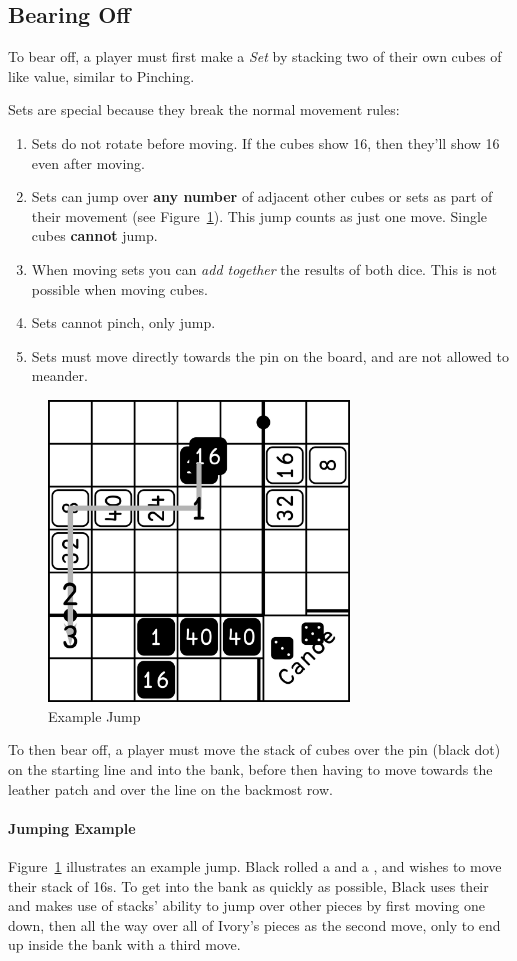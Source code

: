 \subsection{Bearing Off}\label{sec:bearing-off}
To bear off, a player must first make a \textit{Set} by stacking two of their own cubes of like value, similar to Pinching.

Sets are special because they break the normal movement rules:
\begin{enumerate}
    \item Sets do not rotate before moving. If the cubes show 16, then they'll show 16 even after moving.
    \item Sets can jump over \textbf{any number} of adjacent other cubes or sets as part of their movement (see Figure~\ref{fig:jump}). This jump counts as just one move. Single cubes \textbf{cannot} jump.
    \item When moving sets you can \textit{add together} the results of both dice. This is not possible when moving cubes.
    \item Sets cannot pinch, only jump.
    \item Sets must move directly towards the pin on the board, and are not allowed to meander.
\end{enumerate}
\begin{figure}[!h]
    \centering
    \includegraphics[width=8cm]{../graphics/jump}
    \caption{Example Jump}
    \label{fig:jump}
\end{figure}
To then bear off, a player must move the stack of cubes over the pin (black dot) on the starting line and into the bank, before then having to move towards the leather patch and over the line on the backmost row.

\paragraph{Jumping Example}
Figure~\ref{fig:jump} illustrates an example jump.
Black rolled a  and a , and wishes to move their stack of 16s.
To get into the bank as quickly as possible, Black uses their  and makes use of stacks' ability to jump over other pieces by first moving one down, then all the way over all of Ivory's pieces as the second move, only to end up inside the bank with a third move.

